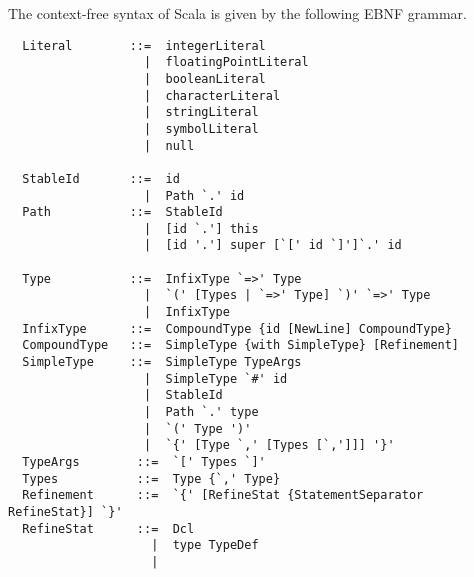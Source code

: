 The context-free syntax of Scala is given by the following EBNF
grammar.

\begin{lstlisting}
  Literal        ::=  integerLiteral
                   |  floatingPointLiteral
                   |  booleanLiteral
                   |  characterLiteral
                   |  stringLiteral
                   |  symbolLiteral
                   |  null

  StableId       ::=  id
                   |  Path `.' id
  Path           ::=  StableId
                   |  [id `.'] this
                   |  [id '.'] super [`[' id `]']`.' id

  Type           ::=  InfixType `=>' Type
                   |  `(' [Types | `=>' Type] `)' `=>' Type
                   |  InfixType
  InfixType      ::=  CompoundType {id [NewLine] CompoundType}
  CompoundType   ::=  SimpleType {with SimpleType} [Refinement]
  SimpleType     ::=  SimpleType TypeArgs
                   |  SimpleType `#' id
                   |  StableId
                   |  Path `.' type
                   |  `(' Type ')'
                   |  `{' [Type `,' [Types [`,']]] '}'
  TypeArgs        ::=  `[' Types `]'
  Types           ::=  Type {`,' Type}
  Refinement      ::=  `{' [RefineStat {StatementSeparator RefineStat}] `}'
  RefineStat      ::=  Dcl
                    |  type TypeDef
                    |


\end{lstlisting}
